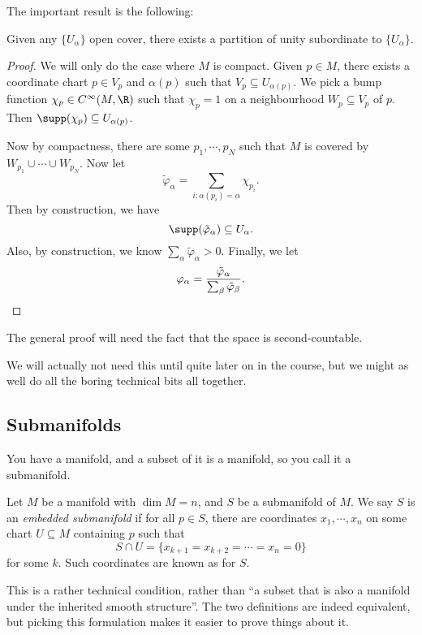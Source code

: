 \documentclass[a4paper]{article}
\begin{document}
The important result is the following:
\begin{thm}
  Given any $\{U_\alpha\}$ open cover, there exists a partition of unity subordinate to $\{U_\alpha\}$.
\end{thm}

\begin{proof}
  We will only do the case where $M$ is compact. Given $p \in M$, there exists a coordinate chart $p \in V_p$ and $\alpha(p)$ such that $V_p \subseteq U_{\alpha(p)}$. We pick a bump function $\chi_p \in C^\infty(M, \R)$ such that $\chi_p = 1$ on a neighbourhood $W_p \subseteq V_p$ of $p$. Then $\supp(\chi_p) \subseteq U_{\alpha(p)}$.

  Now by compactness, there are some $p_1, \cdots, p_N$ such that $M$ is covered by $W_{p_1} \cup \cdots \cup W_{p_N}$. Now let
  \[
    \tilde{\varphi}_\alpha = \sum_{i: \alpha(p_i) = \alpha} \chi_{p_i}.
  \]
  Then by construction, we have
  \[
    \supp(\tilde{\varphi}_\alpha) \subseteq U_\alpha.
  \]
  Also, by construction, we know $\sum_\alpha \tilde{\varphi}_\alpha > 0$. Finally, we let
  \[
    \varphi_\alpha = \frac{\tilde{\varphi}_\alpha}{\sum_\beta \tilde{\varphi}_\beta}. \qedhere
  \]
\end{proof}
The general proof will need the fact that the space is second-countable.

We will actually not need this until quite later on in the course, but we might as well do all the boring technical bits all together.

\subsection{Submanifolds}
You have a manifold, and a subset of it is a manifold, so you call it a submanifold.

\begin{defi}
  Let $M$ be a manifold with $\dim M = n$, and $S$ be a submanifold of $M$. We say $S$ is an \emph{embedded submanifold} if for all $p \in S$, there are coordinates $x_1, \cdots, x_n$ on some chart $U \subseteq M$ containing $p$ such that
  \[
    S \cap U = \{x_{k + 1} = x_{k + 2} = \cdots = x_n = 0\}
  \]
  for some $k$. Such coordinates are known as  for $S$.
\end{defi}
This is a rather technical condition, rather than ``a subset that is also a manifold under the inherited smooth structure''. The two definitions are indeed equivalent, but picking this formulation makes it easier to prove things about it.
\end{document}
